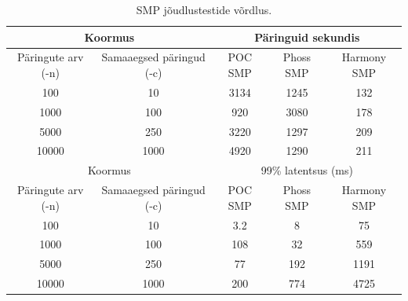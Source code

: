 \begin{table}[H]
    \caption{SMP jõudlustestide võrdlus.}
    \label{tab:smp-performance-comparison}
    \begin{tabular}{|c|c|c|c|c|}
        \hline
        \multicolumn{2}{|c|}{Koormus} & \multicolumn{3}{c|}{Päringuid sekundis} \\
        \hline
        Päringute arv (-n) & Samaaegsed päringud (-c) & POC SMP & Phoss SMP & Harmony SMP \\
        \hline
        100 & 10 & \cellcolor{best}3134 & 1245 & \cellcolor{worst}132 \\
        \hline
        1000 & 100 & 920 & \cellcolor{best}3080 & \cellcolor{worst}178 \\
        \hline
        5000 & 250 & \cellcolor{best}3220 & 1297 & \cellcolor{worst}209 \\
        \hline
        10000 & 1000 & \cellcolor{best}4920 & 1290 & \cellcolor{worst}211 \\
        \hline
        \multicolumn{2}{|c|}{Koormus} & \multicolumn{3}{c|}{99\% latentsus (ms)} \\
        \hline
        Päringute arv (-n) & Samaaegsed päringud (-c) & POC SMP & Phoss SMP & Harmony SMP \\
        \hline
        100 & 10 & \cellcolor{best}3.2 & 8 & \cellcolor{worst}75 \\
        \hline
        1000 & 100 & 108 & \cellcolor{best}32 & \cellcolor{worst}559 \\
        \hline
        5000 & 250 & \cellcolor{best}77 & 192 & \cellcolor{worst}1191 \\
        \hline
        10000 & 1000 & \cellcolor{best}200 & 774 & \cellcolor{worst}4725 \\
        \hline
    \end{tabular}
\end{table}
